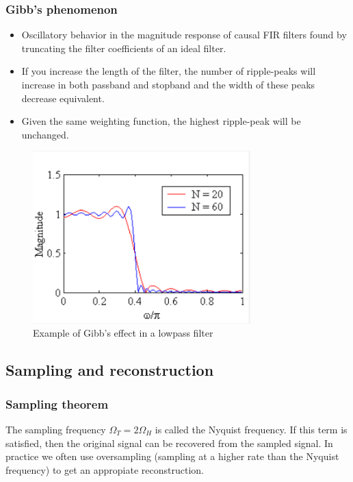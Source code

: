 \documentclass{article}
\begin{document}
\subsubsection{Gibb's phenomenon}

\begin{itemize}
    \item Oscillatory behavior in the magnitude response of causal FIR filters found by truncating the filter coefficients of an ideal filter.
    \item If you increase the length of the filter, the number of ripple-peaks will increase in both passband and stopband and the width of these peaks decrease equivalent.
    \item Given the same weighting function, the highest ripple-peak will be unchanged. 
\end{itemize}
\begin{figure}[h!]
    \centering
    \includegraphics[width=0.75\textwidth]{figures/Filter design/gibbs_effekt.png}
    \caption{Example of Gibb's effect in a lowpass filter}
    \label{fig:gibbs_effect}
\end{figure}

\clearpage

\subsection{Sampling and reconstruction}
\subsubsection{Sampling theorem}
The sampling frequency $\Omega_T = 2\Omega_H$ is called the Nyquist frequency. If this term is satisfied, then the original signal can be recovered from the sampled signal. In practice we often use oversampling (sampling at a higher rate than the Nyquist frequency) to get an appropiate reconstruction.
\end{document}
